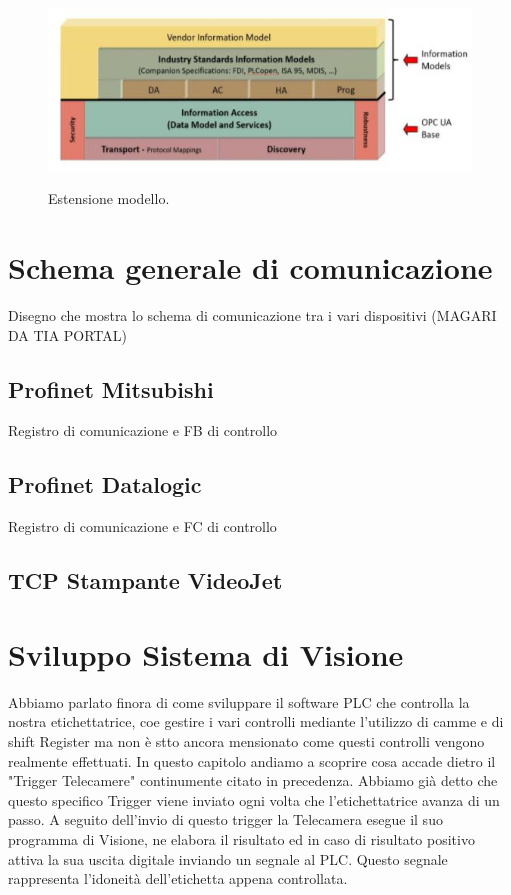 \documentclass[12pt, a4paper, oneside]{book}
\begin{document}
\begin{itemize}
	\begin{figure}[H]
		\centering
		\includegraphics[width=13cm]{Immagini/OPC2}
		\label{OPC2}
		\caption{Estensione modello.}
	\end{figure}
\end{itemize}

\chapter{Schema generale di comunicazione}
Disegno che mostra lo schema di comunicazione tra i vari dispositivi (MAGARI DA TIA PORTAL)
\section{Profinet Mitsubishi}
Registro di comunicazione e FB di controllo
\section{Profinet Datalogic}
Registro di comunicazione e FC di controllo
\section{TCP Stampante VideoJet}

\chapter{Sviluppo Sistema di Visione}
Abbiamo parlato finora di come sviluppare il software PLC che controlla la nostra etichettatrice, coe gestire i vari controlli mediante l'utilizzo di camme e di shift Register ma non è stto ancora mensionato come questi controlli vengono realmente effettuati. In questo capitolo andiamo a scoprire cosa accade dietro il "Trigger Telecamere" continumente citato in precedenza.
Abbiamo già detto che questo specifico Trigger viene inviato ogni volta che  l'etichettatrice avanza di un passo. A seguito dell'invio di questo trigger la Telecamera esegue il suo programma di Visione, ne elabora il risultato ed in caso di risultato positivo attiva la sua uscita digitale inviando un segnale al PLC. Questo segnale rappresenta l'idoneità dell'etichetta appena controllata.
\end{document}
